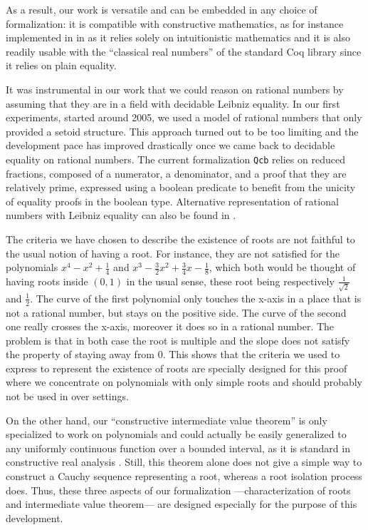 \documentclass{mscs}
\begin{document}
As a result, our work is versatile and can be embedded in any choice of
formalization: it is compatible with constructive mathematics, as for
instance implemented in \Coq{} in \cite{russellreals, russellcoqreals} as it
relies solely on intuitionistic mathematics and it is also readily usable
with the ``classical real numbers'' of the standard Coq library since
it relies on plain equality.

It was instrumental in our work that we could reason on rational numbers by
assuming that they are in a field with decidable Leibniz equality.
In our first experiments, started around 2005, we used a model of rational
numbers that only provided a setoid structure.  This approach turned out to be
too limiting and the development pace has improved drastically once we came
back to decidable equality on rational numbers.  The current formalization
{\tt Qcb} relies on reduced fractions, composed of a numerator, a denominator,
and a proof that they are relatively prime, expressed using a boolean
predicate to benefit from the unicity of equality proofs in the boolean type.
Alternative representation of rational numbers with
Leibniz equality can also be found in \cite{canonicalrationals03}.

The criteria we have chosen to describe the existence of roots are
not faithful to the usual notion of having a root.  For instance, they
are not satisfied for the polynomials \(x^4- x^2 + \frac{1}{4}\) and
\(x^3-\frac{3}{2} x^2 +\frac{3}{4} x -\frac{1}{8}\), which both would
be thought of having roots inside \((0,1)\) in the usual sense, these
root being respectively \(\frac{1}{\sqrt{2}}\) and \(\frac{1}{2}\).
The curve of the first polynomial only touches the x-axis in a place that is
not a rational number, but stays on the positive side.  The curve of
the second one really crosses the x-axis, moreover it does so in a
rational number.  The problem is that in both case the root is multiple
and the slope does not satisfy the property of staying away from 0.
This shows that the criteria we used to express to represent the existence
of roots are specially designed for this proof where we concentrate on
polynomials with only simple roots and should probably not
be used in over settings.

On the other hand,  our ``constructive
intermediate value theorem'' is only specialized to work on polynomials
and could actually be easily generalized to any uniformly continuous
function over a bounded interval, as it is standard in constructive
real analysis \cite{bishop}.  Still, this theorem alone does not
give a simple way to construct a Cauchy sequence representing a root,
whereas a root isolation process does.
Thus, these three aspects of our formalization
---characterization of roots and intermediate value theorem---
are designed especially for the purpose of this development.
\end{document}
